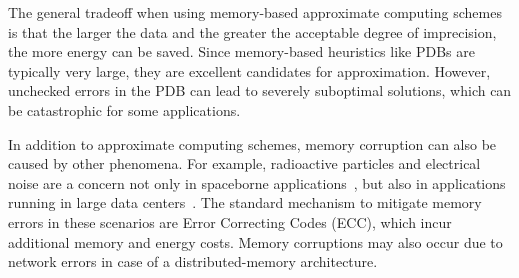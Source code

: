 \documentclass[letterpaper]{article}
\begin{document}
The general tradeoff when using memory-based approximate computing schemes is that the larger the data and the greater the acceptable degree of imprecision, the more energy can be saved. Since memory-based heuristics like PDBs are typically very large, they are excellent candidates for approximation. However, unchecked errors in the PDB can lead to severely suboptimal solutions, which can be catastrophic for some applications. %

In addition to approximate computing schemes, memory corruption can also be caused by other phenomena.
For example, radioactive particles and electrical noise are a concern not only in spaceborne applications~\cite{Wagstaff_kmeansin}, but also in applications running in large data centers~\cite{7266869}. The standard mechanism to mitigate memory errors in these scenarios are Error Correcting Codes (ECC), which incur additional memory and energy costs. %
Memory corruptions may also occur due to network errors in case of a distributed-memory architecture.

\end{document}
